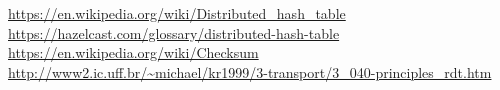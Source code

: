 \documentclass[12pt,a4paper]{article}
\begin{document}
\url{https://en.wikipedia.org/wiki/Distributed_hash_table} \\
\url{https://hazelcast.com/glossary/distributed-hash-table} \\
\url{https://en.wikipedia.org/wiki/Checksum} \\
\url{http://www2.ic.uff.br/~michael/kr1999/3-transport/3_040-principles_rdt.htm}
\end{document}
